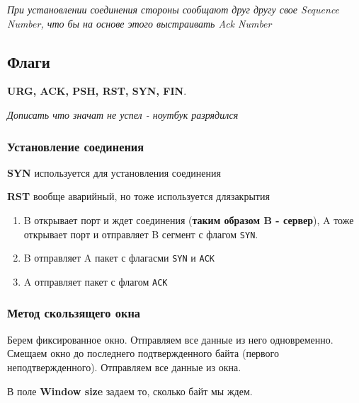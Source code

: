 \documentclass[a4paper,10pt]{article}
\begin{document}
 	\textit{	При установлении соединения стороны сообщают друг другу свое Sequence Number, что бы на основе этого выстраивать Ack Number}
	\subsection{Флаги}
	
	\textbf{URG, ACK, PSH, RST, SYN, FIN}.
	
	\textit{Дописать что значат не успел - ноутбук разрядился} \smiley{} 
	
	\subsubsection{Установление соединения}
	
	\textbf{SYN} используется для установления соединения
	
	\textbf{RST} вообще аварийный, но тоже используется длязакрытия
	
	\begin{enumerate}
		\item B открывает порт и ждет соединения (\textbf{таким образом B - сервер}), A тоже открывает порт и отправляет B сегмент с флагом \texttt{SYN}. 
		\item B отправляет A пакет с флагасми \texttt{SYN} и \texttt{ACK}
		\item A отправляет пакет с флагом \texttt{ACK}
	\end{enumerate}

	\subsubsection{Метод скользящего окна}
	
	Берем фиксированное окно. Отправляем все данные из него одновременно. Смещаем окно до последнего подтвержденного байта (первого неподтвержденного). Отправляем все данные из окна.
	
	В поле \textbf{Window size} задаем то, сколько байт мы ждем.
\end{document}
